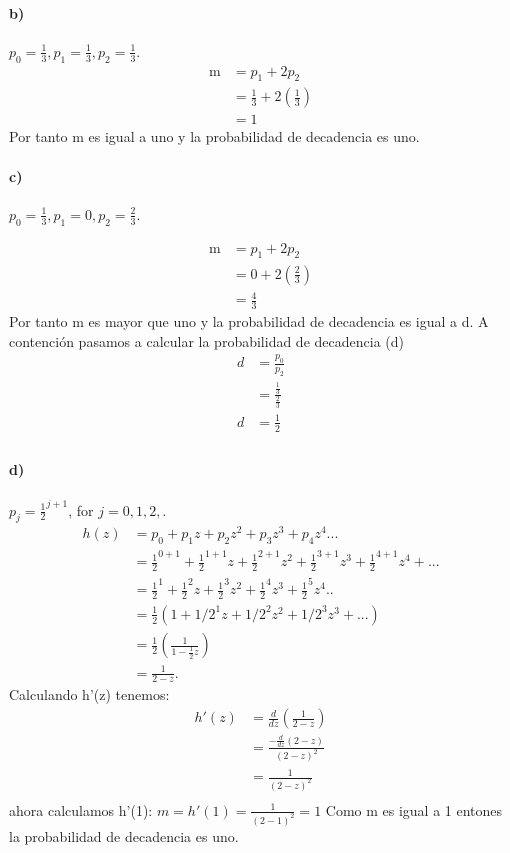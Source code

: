 \documentclass{article}
\begin{document}
\paragraph{b)}$p_0 = \frac{1}{3}, p_1 = \frac{1}{3}, p_2 = \frac{1}{3}$.
\begin{align}
   \mathrm{m}  &= p_{1}+2p_{2} \\
               &= \frac{1}{3} + 2\left(\frac{1}{3}\right)\\
               &= 1
 \end{align}
 Por tanto m es igual a uno y la probabilidad de decadencia es uno.
 \paragraph{c)}$p_0 = \frac{1}{3}, p_1 = 0, p_2 = \frac{2}{3}$.
 
 \begin{align}
   \mathrm{m}  &= p_{1}+2p_{2} \\
               &= 0 + 2\left(\frac{2}{3}\right) \\
               &= \frac{4}{3}
 \end{align}
 Por tanto m es mayor que uno y la probabilidad de decadencia es igual a d. A contención pasamos a calcular la probabilidad de decadencia (d) 
 \begin{align} 
        d & = \frac{p_{0}}{p_{2}}\\ 
          & = \frac{\frac{1}{3}}{\frac{2}{3}}\\
        d & = \frac{1}{2} \\ 
\end{align}
\paragraph{d)}$p_j = \frac{1}{2}^{j + 1}$, for $j = 0, 1, 2, $.
 \begin{align}
    h(z) &= p_0 + p_1z + p_2z^2 + p_3z^3 +p_4z^4 ... \\
      &= \frac{1}{2}^{0 + 1} + \frac{1}{2}^{1 + 1}z + \frac{1}{2}^{2 + 1}z^2 + \frac{1}{2}^{3 + 1}z^3 +\frac{1}{2}^{4 + 1}z^4 +...\\
      &= \frac{1}{2}^{1} + \frac{1}{2}^{2}z + \frac{1}{2}^{3}z^2 + \frac{1}{2}^{4}z^3 +\frac{1}{2}^{5}z^4 .. \\
      &= \frac{1}{2} (1 + 1 / 2^{1}z + 1 / 2^{2}z^2 + 1 / 2^{3}z^3 +...)\\
      &= \frac{1}{2} \left(\frac{1}{1 - \frac{1}{2} z}\right)\\
      &= \frac{1}{2 - z}.
  \end{align}
 Calculando  h'(z) tenemos:
 \begin{align} 
        h'(z) &= \frac{d}{dz} \left( \frac{1}{2 - z} \right)\\
         &= \frac{- \frac{d}{dz} \left( 2 - z \right)}{(2 - z)^2}\\
          &= \frac{1}{(2 - z)^2}\\
\end{align}
ahora calculamos h'(1):
 $m = h'(1) = \frac{1}{(2 - 1)^2} = 1 $
 Como m es igual a 1 entones la probabilidad de decadencia es uno.
\end{document}
